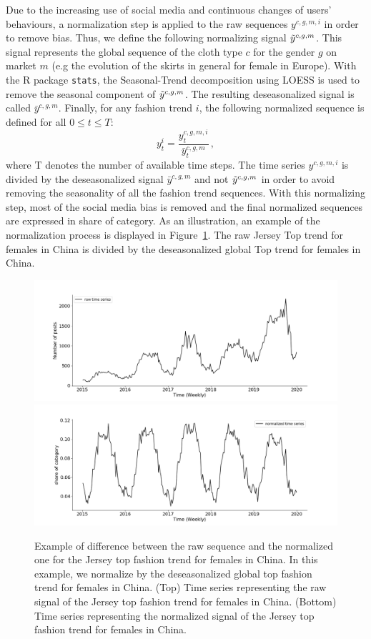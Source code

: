 \documentclass[10pt]{article} %
\begin{document}
Due to the increasing use of social media and continuous changes of users' behaviours, a normalization step is applied to the raw sequences $y^{c,g,m,i}$ in order to remove bias. Thus, we define the following normalizing signal $\Tilde{y}^{c,g,m}$. This signal represents the global sequence of the cloth type $c$ for the gender $g$ on market $m$ (e.g the evolution of the skirts in general for female in Europe). With the R package \texttt{stats}, the Seasonal-Trend decomposition using LOESS  \citep{cleveland1990} is used to remove the seasonal component of $\Tilde{y}^{c,g,m}$. The resulting deseasonalized signal is called  $\bar{y}^{c,g,m}$. Finally, for any fashion trend $i$, the following normalized sequence is defined for all $ 0 \leq t \leq T$:
\begin{equation}
    y^{i}_t = \frac{y^{c,g,m,i}_{t}}{\bar{y}^{c,g,m}_t}\,,
\end{equation}
where T denotes the number of available time steps. The time series $y^{c,g,m,i}$ is divided by the deseasonalized signal $\bar{y}^{c,g,m}$ and not $\Tilde{y}^{c,g,m}$ in order to avoid removing the seasonality of all the fashion trend sequences. With this normalizing step, most of the social media bias is removed and the final normalized sequences are expressed in share of category. As an illustration, an example of the normalization process is displayed in Figure~\ref{fig:normalization}. The raw Jersey Top trend for females in China is divided by the deseasonalized global Top trend for females in China. 

\begin{figure}
\centering
  \includegraphics[width=1.\linewidth]{cn_female_top_raw}
  \includegraphics[width=1.\linewidth]{cn_female_top_norm}
\caption{Example of difference between the raw sequence and the normalized one for the Jersey top fashion trend for females in China. In this example, we normalize by the deseasonalized global top fashion trend for females in China. (Top) Time series representing the raw signal of the Jersey top fashion trend for females in China. (Bottom) Time series representing the normalized signal of the Jersey top fashion trend for females in China.}
\label{fig:normalization}
\end{figure}
\end{document}

